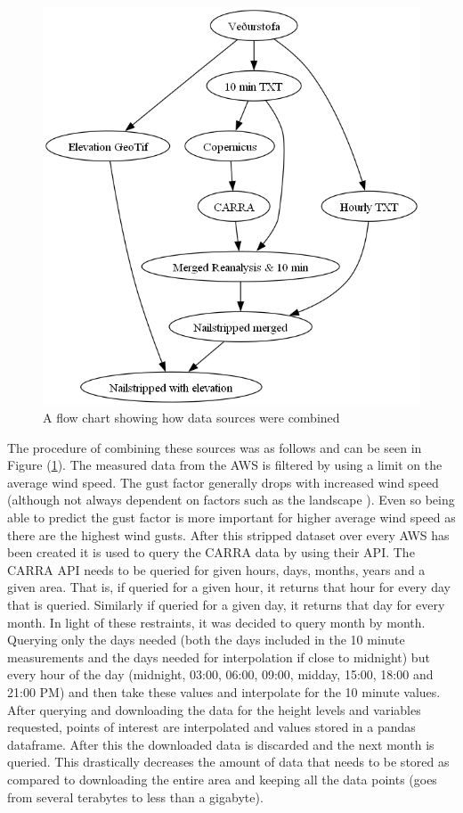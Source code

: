 \begin{figure}[h]
    \caption{A flow chart showing how data sources were combined}
    \label{fig:data_preprocessing_flow_chart}
    \includegraphics[scale = 0.5]{Figures/data-preprocessing-flow-chart.png}
\end{figure}

The procedure of combining these sources was as follows and can be seen in Figure (\ref{fig:data_preprocessing_flow_chart}). The measured data from the AWS is filtered by using a limit on the average wind speed. The gust factor generally drops with increased wind speed (although not always dependent on factors such as the landscape \cite{GNP_vidtal}). Even so being able to predict the gust factor is more important for higher average wind speed as there are the highest wind gusts. After this stripped dataset over every AWS has been created it is used to query the CARRA data by using their API. The CARRA API needs to be queried for given hours, days, months, years and a given area. That is, if queried for a given hour, it returns that hour for every day that is queried. Similarly if queried for a given day, it returns that day for every month. In light of these restraints, it was decided to query month by month. Querying only the days needed (both the days included in the 10 minute measurements and the days needed for interpolation if close to midnight) but every hour of the day (midnight, 03:00, 06:00, 09:00, midday, 15:00, 18:00 and 21:00 PM) and then take these values and interpolate for the 10 minute values. After querying and downloading the data for the height levels and variables requested, points of interest are interpolated and values stored in a pandas dataframe. After this the downloaded data is discarded and the next month is queried. This drastically decreases the amount of data that needs to be stored as compared to downloading the entire area and keeping all the data points (goes from several terabytes to less than a gigabyte).

